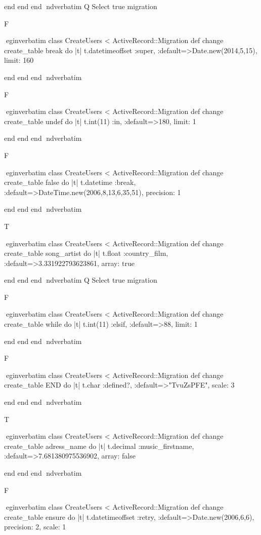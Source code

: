     end 
  end 
end
nd{verbatim}
Q
 Select true migration

F

egin{verbatim}
 class CreateUsers < ActiveRecord::Migration 
  def change 
    create_table break do |t| 
      t.datetimeoffset :super, :default=>Date.new(2014,5,15), limit: 160
    
    end 
  end 
end
nd{verbatim}

F

egin{verbatim}
 class CreateUsers < ActiveRecord::Migration 
  def change 
    create_table undef do |t| 
      t.int(11) :in, :default=>180, limit: 1
    
    end 
  end 
end
nd{verbatim}

F

egin{verbatim}
 class CreateUsers < ActiveRecord::Migration 
  def change 
    create_table false do |t| 
      t.datetime :break, :default=>DateTime.new(2006,8,13,6,35,51), precision: 1
    
    end 
  end 
end
nd{verbatim}

T

egin{verbatim}
 class CreateUsers < ActiveRecord::Migration 
  def change 
    create_table song_artist do |t| 
      t.float :country_film, :default=>3.331922793623861, array: true
    
    end 
  end 
end
nd{verbatim}
Q
 Select true migration

F

egin{verbatim}
 class CreateUsers < ActiveRecord::Migration 
  def change 
    create_table while do |t| 
      t.int(11) :elsif, :default=>88, limit: 1
    
    end 
  end 
end
nd{verbatim}

F

egin{verbatim}
 class CreateUsers < ActiveRecord::Migration 
  def change 
    create_table END do |t| 
      t.char :defined?, :default=>"TvuZsPFE", scale: 3
    
    end 
  end 
end
nd{verbatim}

T

egin{verbatim}
 class CreateUsers < ActiveRecord::Migration 
  def change 
    create_table adress_name do |t| 
      t.decimal :music_firstname, :default=>7.681380975536902, array: false
    
    end 
  end 
end
nd{verbatim}

F

egin{verbatim}
 class CreateUsers < ActiveRecord::Migration 
  def change 
    create_table ensure do |t| 
      t.datetimeoffset :retry, :default=>Date.new(2006,6,6), precision: 2, scale: 1
    
